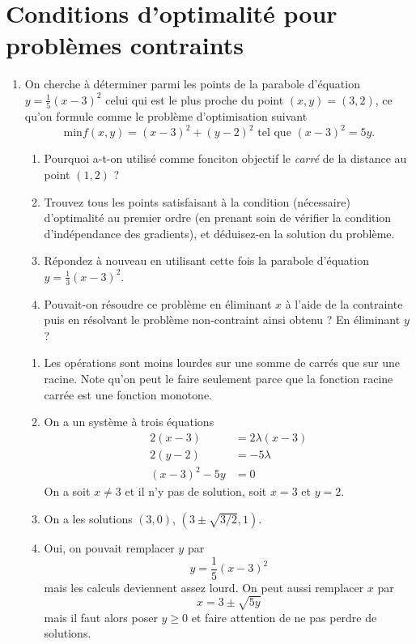\section{Conditions d'optimalité pour problèmes contraints}
\label{sec:nonlinApe2}  

\begin{enumerate}

  \item On cherche à déterminer parmi les points de la parabole
  d'équation $y=\frac{1}{5}(x-3)^2$ celui qui est le plus proche
  du point $(x,y)=(3,2)$, ce qu'on formule comme le
  problème d'optimisation suivant
  \[ \text{min} f(x,y) = (x-3)^2 + (y-2)^2 \text{ tel que } (x-3)^2 = 5y .\]
  \begin{enumerate}
    \item Pourquoi a-t-on utilisé comme fonciton objectif le \emph{carré}
    de la distance au point $(1,2)$ ?
    \item Trouvez tous les points satisfaisant à la condition (nécessaire)
    d'optimalité au premier ordre (en prenant soin de vérifier la condition 
    d'indépendance des gradients), et déduisez-en la solution du problème.
    \item Répondez à nouveau en utilisant cette fois la parabole 
    d'équation $y=\frac{1}{3}(x-3)^2$.
    \item Pouvait-on résoudre ce problème en éliminant $x$ à l'aide de la contrainte
    puis en résolvant le problème non-contraint ainsi obtenu ? 
    En éliminant $y$ ?
  \end{enumerate}
  
  \begin{solution}
    \begin{enumerate}
      \item Les opérations sont moins lourdes sur une somme de carrés 
      que sur une racine. Note qu'on peut le faire seulement parce que
      la fonction racine carrée est une fonction monotone.
      \item On a un système à trois équations 
      \begin{align*}
               2(x-3) &= 2\lambda (x-3) \\ 
               2(y-2) &= -5\lambda \\
               (x-3)^2 - 5y &= 0
      \end{align*}
      On a soit $x\neq 3$ et il n'y pas de solution,
      soit $x=3$ et $y=2$.
      \item On a les solutions $(3,0)$, $(3\pm\sqrt{3/2},1)$.
      \item Oui, on pouvait remplacer $y$ par 
      \[ y = \frac{1}{5}(x-3)^2 \]
      mais les calculs deviennent assez lourd.
      On peut aussi remplacer $x$ par 
      \[ x = 3 \pm \sqrt{5y} \] 
      mais il faut alors poser $y \geq 0$ 
      et faire attention de ne pas perdre de solutions.
    \end{enumerate}
    

\end{solution}
\end{enumerate}
